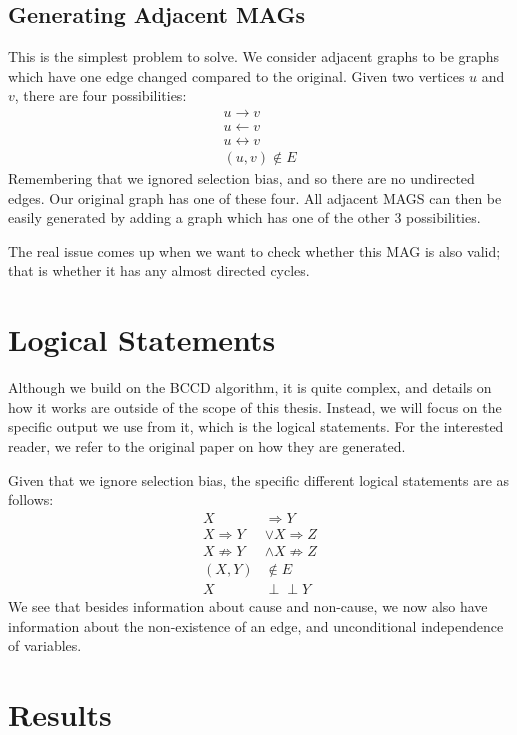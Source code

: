 \documentclass[11pt,a4paper]{report}
\def\ci{\perp\!\!\!\perp}
\begin{document}
\section{Generating Adjacent MAGs}
This is the simplest problem to solve. We consider adjacent graphs to be
graphs which have one edge changed compared to the original. Given two
vertices $u$ and $v$, there are four possibilities:
\begin{align}
  u \rightarrow v \\
  u \leftarrow v \\
  u \leftrightarrow v\\
  (u, v) \notin E
\end{align}
Remembering that we ignored selection bias, and so there are no undirected
edges. Our original graph has one of these four. All adjacent MAGS can
then be easily generated by adding a graph which has one of the other 3
possibilities.

The real issue comes up when we want to check whether this MAG is also
valid; that is whether it has any almost directed cycles.

\chapter{Logical Statements}\label{problem}
Although we build on the BCCD algorithm, it is quite complex, and details
on how it works are outside of the scope of this thesis. Instead, we will
focus on the specific output we use from it, which is the logical
statements. For the interested reader, we refer to the original paper on
how they are generated\cite{claassenBayesianApproachConstraint2012}.

Given that we ignore selection bias, the specific different logical
statements are as follows:
\begin{align*}
  X &\Rightarrow Y \\
  X \Rightarrow Y &\lor X \Rightarrow Z \\
  X \not \Rightarrow Y &\land X \not \Rightarrow Z \\
  (X, Y) &\notin E \\
  X &\ci Y
\end{align*}
We see that besides information about cause and non-cause, we now also
have information about the non-existence of an edge, and unconditional
independence of variables.


\chapter{Results}\label{results}
\end{document}
